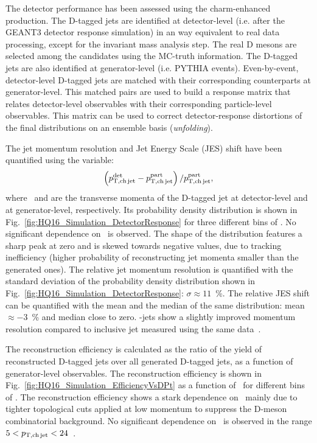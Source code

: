 \documentclass[a4paper]{jpconf}
\begin{document}
The detector performance has been assessed using the charm-enhanced production. The D-tagged jets are identified at detector-level (i.e. after the GEANT3 detector response simulation)
in an way equivalent to real data processing, except for the invariant mass analysis step. The real D mesons are selected among the candidates using the MC-truth information.
The D-tagged jets are also identified at generator-level (i.e. PYTHIA events). Even-by-event, detector-level D-tagged jets are matched with their corresponding counterparts at generator-level.
This matched pairs are used to build a response matrix that relates detector-level observables with their corresponding particle-level observables. This matrix can be used
to correct detector-response distortions of the final distributions on an ensemble basis (\emph{unfolding}).

The jet momentum resolution and Jet Energy Scale (JES) shift have been quantified using the variable: 
\begin{equation}
\left( p_{\mathrm{T,ch\,jet}}^{\mathrm{det}} - p_{\mathrm{T,ch\,jet}}^{\mathrm{part}} \right) / p_{\mathrm{T,ch\,jet}}^{\mathrm{part}}, 
\end{equation}
where \ptchjetdet\ and \ptchjetgen are the transverse momenta of the D-tagged jet at detector-level and at generator-level, respectively.
Its probability density distribution is shown in Fig.~\ref{fig:HQ16_Simulation_DetectorResponse} for three different bins of \ptchjetgen. No significant dependence on \ptchjetgen\ is observed.
The shape of the distribution features a sharp peak at zero and is skewed towards negative values, due to tracking inefficiency (higher probability of
reconstructing jet momenta smaller than the generated ones). The relative jet momentum resolution is quantified with the standard deviation
of the probability density distribution shown in Fig.~\ref{fig:HQ16_Simulation_DetectorResponse}: $\sigma\approx11$~\%. The relative JES shift can be quantified with the mean and the median of the same distribution:
mean~$\approx-3$~\% and median close to zero. \Dzero-jets show a slightly improved momentum resolution compared to inclusive jet measured using the same data~\cite{ALICE:2015e}.

The reconstruction efficiency is calculated as the ratio of the yield of reconstructed D-tagged jets over all generated D-tagged jets, as a function of generator-level observables.
The reconstruction efficiency is shown in Fig.~\ref{fig:HQ16_Simulation_EfficiencyVsDPt} as a function of \ptd\ for different bins of \ptchjet. The reconstruction efficiency shows a stark dependence on \ptd\ mainly due to
tighter topological cuts applied at low momentum to suppress the D-meson combinatorial background. No significant dependence on \ptchjet\ is observed in the range $5<p_{\mathrm{T,ch\, jet}}<24$~\GeVc.
\end{document}
